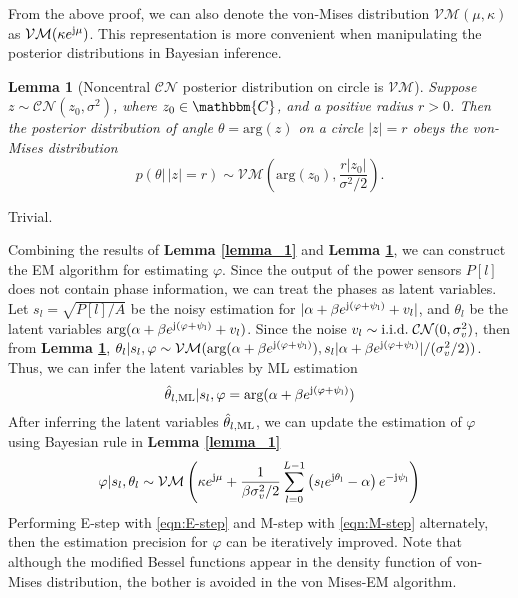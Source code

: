 \documentclass[12pt,draftclsnofoot,journal,onecolumn]{IEEEtran}
\newtheorem{lemma}{\bf Lemma}
\theoremstyle{nonumberplain}
\def \arg {\text{arg}}
\def \CN {\mathcal{CN}}
\def \VM {\mathcal{VM}}
\def \j  {\rm {j}}
\begin{document}
    From the above proof, we can also denote the von-Mises distribution $\VM(\mu, \kappa)$ as $\VM(\kappa e^{\j\mu})$. This representation is more convenient when manipulating the posterior distributions in Bayesian inference.

    \begin{lemma}[Noncentral $\CN$ posterior distribution on circle is $\VM$]\label{lemma_2}
        Suppose $z \sim \CN(z_0, \sigma^2)$, where $z_0 \in \mathbbm{C}$, and a positive radius $r>0$. Then the posterior distribution of angle $\theta= \arg (z)$ on a circle $|z|=r$ obeys the von-Mises distribution
        \begin{equation}
            p(\theta |\, |z|=r) \sim \VM\left(\arg(z_0), \frac{r|z_0|}{\sigma^2/2}\right).
        \end{equation}
    \end{lemma}
    \begin{IEEEproof}
        Trivial.
    \end{IEEEproof}
    Combining the results of {\bf Lemma \ref{lemma_1}} and {\bf Lemma \ref{lemma_2}}, we can construct the EM algorithm for estimating $\varphi$. Since the output of the power sensors $P[l]$ does not contain phase information, we can treat the phases as latent variables. Let $s_l = \sqrt{P[l]/A}$ be the noisy estimation for $|\alpha + \beta e^{\j (\varphi + \psi_l)} + v_l|$, and $\theta_l$ be the latent variables $\arg (\alpha + \beta e^{\j (\varphi + \psi_l)} + v_l)$. Since the noise $v_l \sim {\rm i.i.d.}\;\CN(0, \sigma_v^2)$, then from {\bf Lemma \ref{lemma_2}}, $\theta_l | s_l, \varphi \sim \VM(\arg(\alpha + \beta e^{\j (\varphi + \psi_l)}), s_l |\alpha + \beta e^{\j (\varphi + \psi_l)}|/(\sigma_v^2/2))$. Thus, we can infer the latent variables by ML estimation 
    \begin{equation}
        \hat{\theta}_{l, {\rm ML}} | s_l, \varphi = \arg(\alpha + \beta e^{\j (\varphi + \psi_l)})
        \label{eqn:E-step}
    \end{equation}
    After inferring the latent variables $\hat{\theta}_{l, {\rm ML}}$, we can update the estimation of $\varphi$ using Bayesian rule in {\bf Lemma \ref{lemma_1}}
    \begin{equation}
        \varphi | s_l, \theta_l \sim \VM\left( \kappa e^{\j \mu} + \frac{1}{\beta\sigma_v^2/2}\sum_{l=0}^{L-1}{\left(s_l e^{\j\theta_l}-\alpha\right)e^{-\j \psi_l}}\right)
        \label{eqn:M-step}
    \end{equation}
    Performing E-step with \eqref{eqn:E-step} and M-step with \eqref{eqn:M-step} alternately, then the estimation precision for $\varphi$ can be iteratively improved. Note that although the modified Bessel functions appear in the density function of von-Mises distribution, the bother is avoided in the von Mises-EM algorithm.
\end{document}
